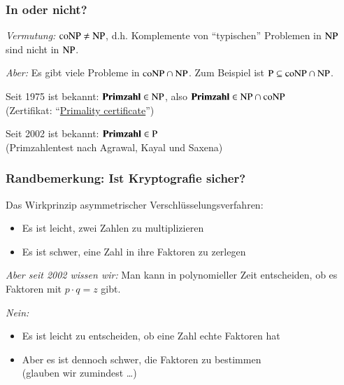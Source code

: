 \documentclass[aspectratio=1610,onlymath]{beamer}
\begin{document}
\begin{frame}\frametitle{In  oder nicht?}

\emph{Vermutung:} ${\textsc{coNP}}\neq{\textsc{NP}}$, d.h. Komplemente von
"`typischen"' Problemen in ${\textsc{NP}}$ sind nicht in ${\textsc{NP}}$.
\bigskip

\emph{Aber:} Es gibt viele Probleme in ${\textsc{coNP}}\cap{\textsc{NP}}$. Zum Beispiel
ist ${\textsc{P}}\subseteq{\textsc{coNP}}\cap{\textsc{NP}}$.
\bigskip\pause

\pause

Seit 1975 ist bekannt: $\textbf{\textcolor{black}{Primzahl}}\in{\textsc{NP}}$, also
$\textbf{\textcolor{black}{Primzahl}}\in{\textsc{NP}}\cap{\textsc{coNP}}$\\
(Zertifikat: "`\href{https://en.wikipedia.org/wiki/Primality_certificate}{Primality certificate}"')
\bigskip\pause

Seit 2002 ist bekannt: $\textbf{\textcolor{black}{Primzahl}}\in{\textsc{P}}$\\
(Primzahlentest nach Agrawal, Kayal und Saxena)


\end{frame}


\begin{frame}\frametitle{Randbemerkung: Ist Kryptografie sicher?}

Das Wirkprinzip asymmetrischer Verschlüsselungsverfahren:
\begin{itemize}
\item Es ist \alert{leicht}, zwei Zahlen zu multiplizieren
\item Es ist \alert{schwer}, eine Zahl in ihre Faktoren zu zerlegen
\end{itemize}\medskip
\emph{Aber seit 2002 wissen wir:} Man kann in polynomieller Zeit entscheiden, ob es
Faktoren mit $p\cdot q=z$ gibt.\bigskip

\pause\bigskip

\emph{Nein:}
\begin{itemize}
\item Es ist \alert{leicht} zu entscheiden, ob eine Zahl echte Faktoren hat
\item Aber es ist dennoch \alert{schwer}, die Faktoren zu bestimmen\\
(glauben wir zumindest \ldots)
\end{itemize}

\end{frame}
\end{document}
